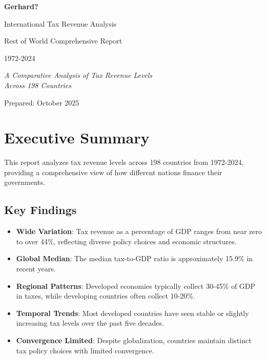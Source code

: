 \documentclass[11pt,letterpaper]{article}
\begin{document}
\begin{titlepage}
\centering
\vspace*{2cm}
{\Huge\bfseries Gerhard?\par}
\vspace{1cm}
{\LARGE International Tax Revenue Analysis\par}
\vspace{0.5cm}
{\Large Rest of World Comprehensive Report\par}
\vspace{0.5cm}
{\large 1972-2024\par}
\vspace{2cm}
{\large\itshape A Comparative Analysis of Tax Revenue Levels\\
Across 198 Countries\par}
\vfill
{\large Prepared: October 2025\par}
\end{titlepage}

\tableofcontents
\newpage

\section{Executive Summary}

This report analyzes tax revenue levels across 198 countries from 1972-2024, providing a comprehensive view of how different nations finance their governments.

\subsection{Key Findings}

\begin{itemize}
    \item \textbf{Wide Variation}: Tax revenue as a percentage of GDP ranges from near zero to over 44\%, reflecting diverse policy choices and economic structures.
    \item \textbf{Global Median}: The median tax-to-GDP ratio is approximately 15.9\% in recent years.
    \item \textbf{Regional Patterns}: Developed economies typically collect 30-45\% of GDP in taxes, while developing countries often collect 10-20\%.
    \item \textbf{Temporal Trends}: Most developed countries have seen stable or slightly increasing tax levels over the past five decades.
    \item \textbf{Convergence Limited}: Despite globalization, countries maintain distinct tax policy choices with limited convergence.
\end{itemize}
\end{document}
